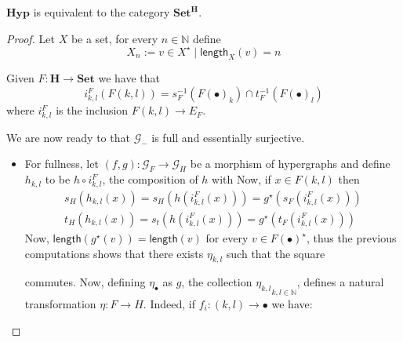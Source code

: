 \documentclass[a4paper,UKenglish,cleveref,pdftex,thm-restate,numberwithinsect]{lipics-v2021}
\newcommand{\cat}[1]{\ensuremath{\mathbf{#1}}}
\newcommand{\hyp}{\cat{Hyp}}
\newcommand{\lgt}[0]{\mathsf{length}}
\begin{document}
\begin{proposition}
	$\hyp$ is equivalent to the category $\cat{Set}^{\cat{H}}$.
\end{proposition}
\begin{proof}
	Let $X$ be a set, for every $n\in \mathbb{N}$ define
	\[X_{n}:= {v\in X^{\star} \mid \lgt_X(v)=n}\]
	
	Given $F:\cat{H}\to \cat{Set}$ we have that
	\[i^F_{k,l} (F(k,l))=s^{-1}_F (F(\bullet)_{k})\cap t^{-1}_F (F(\bullet)_{l}) \]
	where $i^{F}_{k,l}$ is the inclusion $F(k,l)\to E_F$.
	
	We are now ready to that $\mathcal{G}_{-}$ is full and essentially surjective.
	\begin{itemize}
		\item For fullness, let $(f,g):\mathcal{G}_F\to \mathcal{G}_{H}$ be a morphism of hypergraphs and define $h_{k,l}$ to be $h\circ i^F_{k,l}$, the composition of $h$ with Now, if $x\in F(k,l)$ then 
		\begin{gather*}s_H (h_{k,l} (x))=s_H (h (i^F_{k,l} (x)))=g^{\star} (s_{F} (i^F_{k,l} (x)))\\t_H (h_{k,l} (x))=s_t (h (i^F_{k,l} (x)))=g^{\star} (t_{F} (i^F_{k,l} (x)))
		\end{gather*}
		Now, $\lgt (g^{\star}(v))=\lgt (v)$ for every $v\in F(\bullet)^{\star}$, thus the previous computations shows that there exists $\eta_{k,l}$ such that the square
		\begin{center}
		\end{center}
		commutes.  Now, defining $\eta_{\bullet}$ as $g$, the collection $ {\eta_{k,l}}_{k,l\in \mathbb{N}}$, defines a natural transformation $\eta:F\to H$. Indeed, if $f_i:(k,l)\to \bullet$ we have:
		\begin{center}
\end{center}
\end{itemize}
\end{proof}
\end{document}
